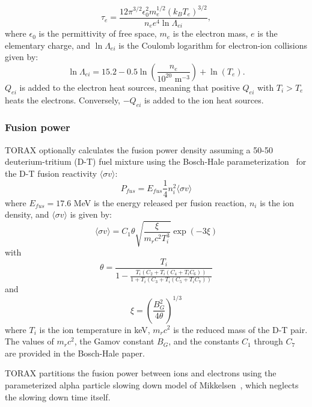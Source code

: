 \documentclass[aps, reprint, nofootinbib]{revtex4-2}
\begin{document}
\begin{equation}
\tau_e = \frac{12 \pi^{3/2} \epsilon_0^2 m_e^{1/2} (k_B T_e)^{3/2}}{n_e e^4 \ln \Lambda_{ei}}, 
\end{equation}
where $\epsilon_0$ is the permittivity of free space, $m_e$ is the electron mass,
$e$ is the elementary charge, and $\ln \Lambda_{ei}$ is the Coulomb logarithm for electron-ion collisions given by:
\begin{equation}
\ln \Lambda_{ei} = 15.2 - 0.5 \ln \left(\frac{n_e}{10^{20} \text{ m}^{-3}}\right) + \ln (T_e).
\end{equation}
$Q_{ei}$ is added to the electron heat sources, meaning that positive $Q_{ei}$ with $T_i>T_e$ heats the electrons. Conversely, $-Q_{ei}$ is added to the ion heat sources.

\subsubsection{Fusion power}
TORAX optionally calculates the fusion power density assuming a 50-50 deuterium-tritium (D-T) fuel mixture using the Bosch-Hale parameterization~\cite{bosch:1992} for the D-T fusion reactivity $\langle \sigma v \rangle$:
\begin{equation}
P_{fus} = E_{fus} \frac{1}{4} n_i^2 \langle \sigma v \rangle
\end{equation}
where $E_{fus} = 17.6$ MeV is the energy released per fusion reaction, $n_i$ is the ion density, and $\langle \sigma v \rangle$ is given by:
\begin{equation}
\langle \sigma v \rangle = C_1 \theta \sqrt{\frac{\xi}{m_rc^2 T_i^3}} \exp(-3\xi)
\end{equation}
with
\begin{equation}
\theta = \frac{T_i}{1-\frac{T_i (C_2+T_i(C_4+T_iC_6))}{1+T_i(C_3+T_i(C_5+T_i C_7))}}
\end{equation}
and
\begin{equation}
\xi = \left(\frac{B_G^2}{4\theta}\right)^{1/3}    
\end{equation}
where $T_i$ is the ion temperature in keV, $m_rc^2$ is the reduced mass of the D-T pair. The values of $m_rc^2$, the Gamov constant $B_G$, and the constants $C_1$ through $C_7$ are provided in the Bosch-Hale paper.

TORAX partitions the fusion power between ions and electrons using the parameterized alpha particle slowing down model of Mikkelsen~\cite{mikkelsen:1983}, which neglects the slowing down time itself.
\end{document}
